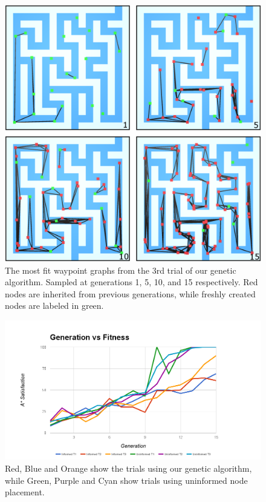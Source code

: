 	
	\begin{figure}
		\includegraphics[width=1\columnwidth]{tests/geneticT3b}
		\caption{The most fit waypoint graphs from the 3rd trial of our genetic algorithm. Sampled at generations 1, 5, 10, and 15 respectively. Red nodes are inherited from previous generations, while freshly created nodes are labeled in green.}
	\end{figure}
	
	\begin{figure}
		\includegraphics[width=\textwidth]{tests/genfitness}
		\caption{Red, Blue and Orange show the trials using our genetic algorithm, while Green, Purple and Cyan show trials using uninformed node placement.}
	\end{figure}
	

